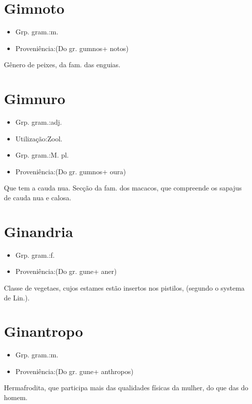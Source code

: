 \section{Gimnoto}
\begin{itemize}
\item {Grp. gram.:m.}
\end{itemize}
\begin{itemize}
\item {Proveniência:(Do gr. \textunderscore gumnos\textunderscore  + \textunderscore notos\textunderscore )}
\end{itemize}
Gênero de peixes, da fam. das enguias.
\section{Gimnuro}
\begin{itemize}
\item {Grp. gram.:adj.}
\end{itemize}
\begin{itemize}
\item {Utilização:Zool.}
\end{itemize}
\begin{itemize}
\item {Grp. gram.:M. pl.}
\end{itemize}
\begin{itemize}
\item {Proveniência:(Do gr. \textunderscore gumnos\textunderscore  + \textunderscore oura\textunderscore )}
\end{itemize}
Que tem a cauda nua.
Secção da fam. dos macacos, que compreende os sapajus de cauda nua e calosa.
\section{Ginandria}
\begin{itemize}
\item {Grp. gram.:f.}
\end{itemize}
\begin{itemize}
\item {Proveniência:(Do gr. \textunderscore gune\textunderscore  + \textunderscore aner\textunderscore )}
\end{itemize}
Classe de vegetaes, cujos estames estão insertos nos pistilos, (segundo o systema de Lin.).
\section{Ginantropo}
\begin{itemize}
\item {Grp. gram.:m.}
\end{itemize}
\begin{itemize}
\item {Proveniência:(Do gr. \textunderscore gune\textunderscore  + \textunderscore anthropos\textunderscore )}
\end{itemize}
Hermafrodita, que participa mais das qualidades físicas da mulher, do que das do homem.
